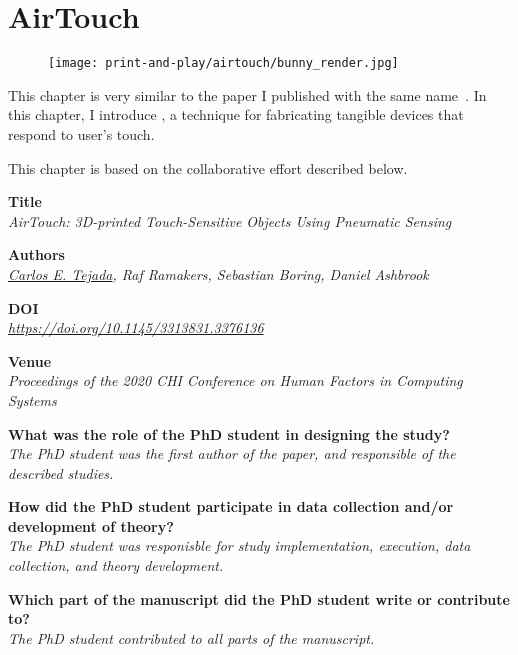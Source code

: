 	\chapter{AirTouch} \label{ch:airtouch}
	\begin{figure}[h]
		\centering
		\texttt{[image: print-and-play/airtouch/bunny\_render.jpg]}
	\end{figure}

	This chapter is very similar to the paper I published with the same
	name~\cite{Tejada:2020}. In this chapter, I introduce \at, a technique for
	fabricating tangible devices that respond to user's touch.

	\newpage

	This chapter is based on the collaborative effort described below.

	\vfill

	\noindent
	\textbf{Title}\\
	\textit{AirTouch: 3D-printed Touch-Sensitive Objects Using Pneumatic Sensing}

	\bigskip

	\noindent
	\textbf{Authors}\\
	\textit{\underline{Carlos E. Tejada}, Raf Ramakers, Sebastian Boring, Daniel Ashbrook}

	\bigskip

	\noindent
	\textbf{DOI}\\
	\textit{\href{https://doi.org/10.1145/3313831.3376136}{https://doi.org/10.1145/3313831.3376136}}

	\bigskip

	\noindent
  \textbf{Venue}\\
  \textit{Proceedings of the 2020 CHI Conference on Human Factors in Computing Systems}

	\bigskip

	\noindent
	\textbf{What was the role of the PhD student in designing the study?}\\
  \textit{The PhD student was the first author of the paper, and responsible
    of the described studies.}

	\bigskip

	\noindent
	\textbf{How did the PhD student participate in data collection and/or development of theory?}\\
  \textit{The PhD student was responisble for study implementation, execution,
    data collection, and theory development.}

	\bigskip

	\noindent
	\textbf{Which part of the manuscript did the PhD student write or contribute to?}\\
  \textit{The PhD student contributed to all parts of the manuscript.}


